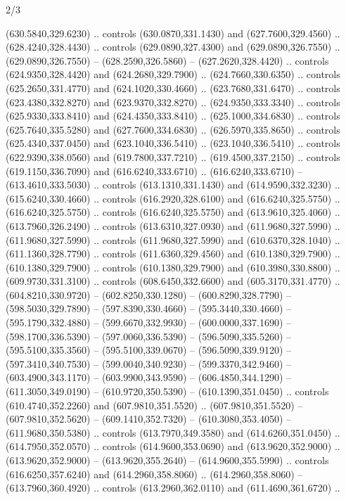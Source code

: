 \begin{flagdescription}{2/3}
\begin{scope}[xshift=0.5\flaglength,yshift=0.5\flagwidth,scale=\flagwidth/638.38]
\begin{scope}[y=0.80pt, x=0.80pt, yscale=-1,shift={(-600,-400)}]
\begin{scope}[shift={(-0.02,2.173)}]
  (630.5840,329.6230) .. controls (630.0870,331.1430) and (627.7600,329.4560) ..
  (628.4240,328.4430) .. controls (629.0890,327.4300) and (629.0890,326.7550) ..
  (629.0890,326.7550) -- (628.2590,326.5860) -- (627.2620,328.4420) .. controls
  (624.9350,328.4420) and (624.2680,329.7900) .. (624.7660,330.6350) .. controls
  (625.2650,331.4770) and (624.1020,330.4660) .. (623.7680,331.6470) .. controls
  (623.4380,332.8270) and (623.9370,332.8270) .. (624.9350,333.3340) .. controls
  (625.9330,333.8410) and (624.4350,333.8410) .. (625.1000,334.6830) .. controls
  (625.7640,335.5280) and (627.7600,334.6830) .. (626.5970,335.8650) .. controls
  (625.4340,337.0450) and (623.1040,336.5410) .. (623.1040,336.5410) .. controls
  (622.9390,338.0560) and (619.7800,337.7210) .. (619.4500,337.2150) .. controls
  (619.1150,336.7090) and (616.6240,333.6710) .. (616.6240,333.6710) --
  (613.4610,333.5030) .. controls (613.1310,331.1430) and (614.9590,332.3230) ..
  (615.6240,330.4660) .. controls (616.2920,328.6100) and (616.6240,325.5750) ..
  (616.6240,325.5750) .. controls (616.6240,325.5750) and (613.9610,325.4060) ..
  (613.7960,326.2490) .. controls (613.6310,327.0930) and (611.9680,327.5990) ..
  (611.9680,327.5990) .. controls (611.9680,327.5990) and (610.6370,328.1040) ..
  (611.1360,328.7790) .. controls (611.6360,329.4560) and (610.1380,329.7900) ..
  (610.1380,329.7900) .. controls (610.1380,329.7900) and (610.3980,330.8800) ..
  (609.9730,331.3100) .. controls (608.6450,332.6600) and (605.3170,331.4770) ..
  (604.8210,330.9720) -- (602.8250,330.1280) -- (600.8290,328.7790) --
  (598.5030,329.7890) -- (597.8390,330.4660) -- (595.3440,330.4660) --
  (595.1790,332.4880) -- (599.6670,332.9930) -- (600.0000,337.1690) --
  (598.1700,336.5390) -- (597.0060,336.5390) -- (596.5090,335.5260) --
  (595.5100,335.3560) -- (595.5100,339.0670) -- (596.5090,339.9120) --
  (597.3410,340.7530) -- (599.0040,340.9230) -- (599.3370,342.9460) --
  (603.4900,343.1170) -- (603.9900,343.9590) -- (606.4850,344.1290) --
  (611.3050,349.0190) -- (610.9720,350.5390) -- (610.1390,351.0450) .. controls
  (610.4740,352.2260) and (607.9810,351.5520) .. (607.9810,351.5520) --
  (607.9810,352.5620) -- (609.1410,352.7320) -- (610.3080,353.4050) --
  (611.9680,350.5380) .. controls (613.7970,349.3580) and (614.6260,351.0450) ..
  (614.7950,352.0570) .. controls (614.9600,353.0690) and (613.9620,352.9000) ..
  (613.9620,352.9000) -- (613.9620,355.2640) -- (614.9600,355.5990) .. controls
  (616.6250,357.6240) and (614.2960,358.8060) .. (614.2960,358.8060) --
  (613.7960,360.4920) .. controls (613.2960,362.0110) and (611.4690,361.6720) ..

\end{scope}
\end{scope}
\end{scope}
\end{flagdescription}
